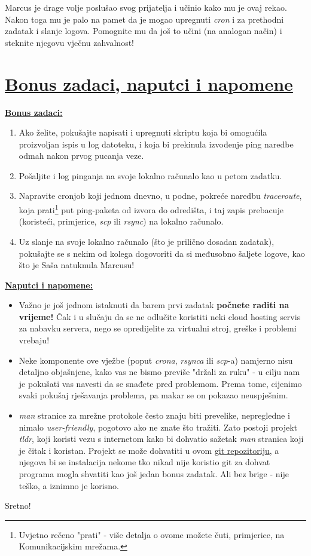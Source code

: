 \documentclass[12pt,a4paper]{article}
\begin{document}
		\par Marcus je drage volje poslušao svog prijatelja i učinio kako mu je ovaj rekao. Nakon toga mu je palo na pamet da je mogao upregnuti \textit{cron} i za prethodni zadatak i slanje logova. Pomognite mu da još to učini (na analogan način) i steknite njegovu vječnu zahvalnost!

	\newpage

	\section*{\underline{Bonus zadaci, naputci i napomene}}
		\underline{\textbf{Bonus zadaci:}}
		\begin{enumerate}
			\item Ako želite, pokušajte napisati i upregnuti skriptu koja bi omogućila proizvoljan ispis u log datoteku, i koja bi prekinula izvođenje ping naredbe odmah nakon prvog pucanja veze.
			\item Pošaljite i log pinganja na svoje lokalno računalo kao u petom zadatku.
			\item Napravite cronjob koji jednom dnevno, u podne, pokreće naredbu \textit{traceroute}, koja prati\footnote{Uvjetno rečeno "prati" - više detalja o ovome možete čuti, primjerice, na Komunikacijskim mrežama.} put ping-paketa od izvora do odredišta, i taj zapis prebacuje (koristeći, primjerice, \textit{scp} ili \textit{rsync}) na lokalno računalo.
			\item Uz slanje na svoje lokalno računalo (što je prilično dosadan zadatak), pokušajte se s nekim od kolega dogovoriti da si međusobno šaljete logove, kao što je Saša natuknula Marcusu!
		\end{enumerate}

		\vfill
		\underline{\textbf{Naputci i napomene: }}
		\begin{itemize}
			\item Važno je još jednom istaknuti da barem prvi zadatak \textbf{počnete raditi na vrijeme!} Čak i u slučaju da se ne odlučite koristiti neki cloud hosting servis za nabavku servera, nego se opredijelite za virtualni stroj, greške i problemi vrebaju!
			\item Neke komponente ove vježbe (poput \textit{crona}, \textit{rsynca} ili \textit{scp}-a) namjerno nisu detaljno objašnjene, kako vas ne bismo previše "držali za ruku" - u cilju nam je pokušati vas navesti da se snađete pred problemom. Prema tome, cijenimo svaki pokušaj rješavanja problema, pa makar se on pokazao neuspješnim.
			\item \textit{man} stranice za mrežne protokole često znaju biti prevelike, nepregledne i nimalo \textit{user-friendly}, pogotovo ako ne znate što tražiti. Zato postoji projekt \textit{tldr}, koji koristi vezu s internetom kako bi dohvatio sažetak \textit{man} stranica koji je čitak i koristan. Projekt se može dohvatiti u ovom \href{https://github.com/tldr-pages/tldr}{git repozitoriju}, a njegova bi se instalacija nekome tko nikad nije koristio git za dohvat programa mogla shvatiti kao još jedan bonus zadatak. Ali bez brige - nije teško, a iznimno je korisno.
		\end{itemize}
		Sretno!
\end{document}
